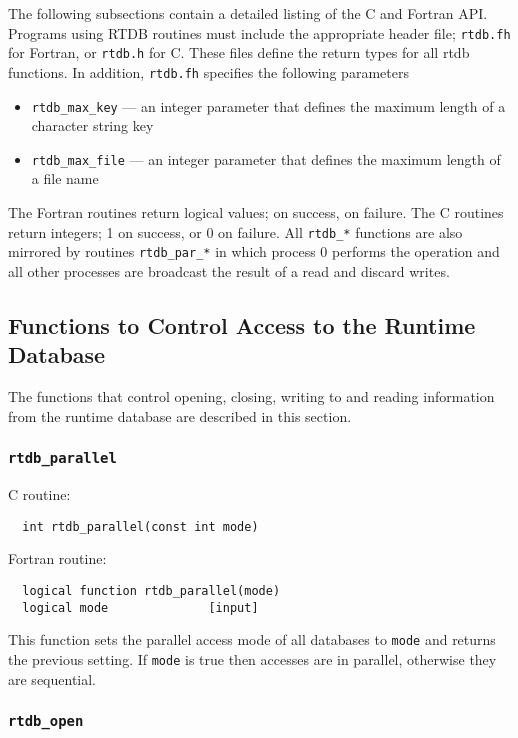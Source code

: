The following subsections contain a detailed listing of the C and Fortran API.  
Programs using RTDB routines must include the appropriate header file; 
{\tt rtdb.fh} for Fortran, or {\tt rtdb.h} for C.   These files define the return
types for all rtdb functions.  In addition, {\tt rtdb.fh} specifies the 
following parameters 
\begin{itemize}
\item {\tt rtdb\_max\_key} --- an integer parameter that defines the maximum
  length of a character string key
\item {\tt rtdb\_max\_file} --- an integer parameter that defines the maximum
  length of a file name
\end{itemize}
The Fortran routines return logical values; \TRUE  on success, \FALSE 
on failure.  The C routines return integers; 1 on success, or 0 on failure.
All \verb+rtdb_*+ functions are also mirrored by routines \verb+rtdb_par_*+
in which process 0 performs the operation and all other processes
are broadcast the result of a read and discard writes.

\subsection{Functions to Control Access to the Runtime Database}

The functions that control opening, closing, writing to and reading information
from the runtime database are described in this section.


\subsubsection{{\tt rtdb\_parallel}}

C routine:

\begin{verbatim}
  int rtdb_parallel(const int mode)
\end{verbatim}


Fortran routine:

\begin{verbatim}
  logical function rtdb_parallel(mode)
  logical mode              [input]
\end{verbatim}
This function sets the parallel access mode of all databases to {\tt mode} and returns the
previous setting. If {\tt mode} is true then accesses are in parallel, otherwise they are
sequential.

\subsubsection{{\tt rtdb\_open}}

